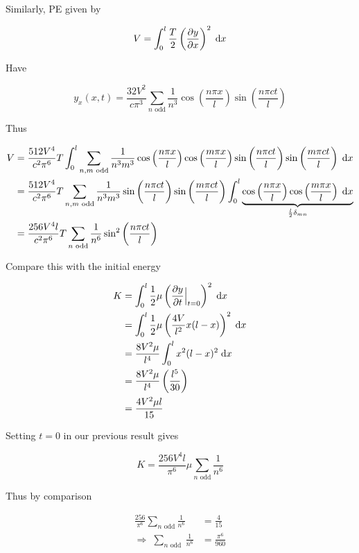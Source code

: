 \documentclass[a4paper]{article}
\begin{document}
Similarly, PE given by

\[ V = \int_{0}^{l} \frac{T}{2} \left(  \frac{\partial y}{\partial x} \right)^{2} \; \mathrm{d} x  \]

Have

\[ y_{x}(x,t) = \frac{32 V^{2}}{c \pi^{3}} \sum_{n \text{ odd}} \frac{1}{n^{3}} \cos \left(  \frac{n \pi x}{l} \right) \sin \left(  \frac{n \pi c t}{l} \right)   \]

Thus

\begin{align*}
V & = \frac{512 V^{4}}{c^{2} \pi^{6}}T \int_{0}^{l} \sum_{n,m \text{ odd}} \frac{1}{n^{3}m^{3}} \cos \left(  \frac{n \pi x}{l} \right) \cos \left(  \frac{m \pi x}{l} \right) \sin \left(  \frac{n \pi c t}{l} \right)  \sin \left(  \frac{m \pi c t}{l} \right)  \; \mathrm{d} x \\
& = \frac{512 V^{4}}{c^{2} \pi^{6}}T  \sum_{n,m \text{ odd}} \frac{1}{n^{3}m^{3}}  \sin \left(  \frac{n \pi c t}{l} \right)  \sin \left(  \frac{m \pi c t}{l} \right) \int_{0}^{l} \underbrace{\cos \left(  \frac{n \pi x}{l} \right) \cos \left(  \frac{m \pi x}{l} \right)   \; \mathrm{d} x}_{\frac{l}{2}\delta_{mn}} \\
& = \frac{256 V^{4}l}{c^{2} \pi^{6}}T  \sum_{n \text{ odd}} \frac{1}{n^{6}}  \sin^{2} \left(  \frac{n \pi c t}{l} \right)  
\end{align*}

Compare this with the initial energy

\begin{align*}
K & = \int_{0}^{l} \frac{1}{2} \mu \left(  \frac{\partial y}{\partial t} \Big|_{t=0} \right)^{2} \; \mathrm{d} x \\
& = \int_{0}^{l} \frac{1}{2} \mu \left(  \frac{4V}{l^{2}}x(l-x) \right)^{2} \; \mathrm{d} x  \\
& =  \frac{8V^{2} \mu}{l^{4}} \int_{0}^{l} x^{2}(l-x)^{2} \; \mathrm{d} x  \\
& = \frac{8V^{2} \mu}{l^{4}} \left( \frac{l^{5}}{30} \right) \\
& = \frac{4V^{2}\mu l}{15}
\end{align*}

Setting $ t = 0 $ in our previous result gives

\[ K = \frac{256 V^{4} l}{\pi^{6}} \mu  \sum_{n\text{ odd}} \frac{1}{n^{6}}  \]

Thus by comparison

\begin{align*}
\frac{256}{\pi^{6}}  \sum_{n\text{ odd}} \frac{1}{n^{6}} & = \frac{4}{15} \\
\Rightarrow \; \sum_{n \text{ odd }} \frac{1}{n^{6}} & = \frac{\pi^{6}}{960} 
\end{align*}
\end{document}
